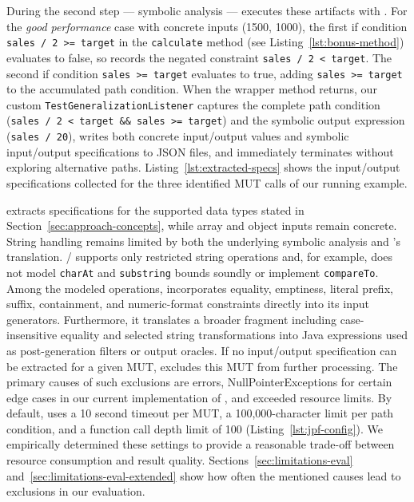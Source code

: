 During the second step --- symbolic analysis --- \ToolTeralizer{} executes these artifacts with \ToolSPF{}.
For the \textit{good performance} case with concrete inputs (1500, 1000),
the first if condition \texttt{sales / 2 >= target}
in the \texttt{calculate} method (see Listing~\ref{lst:bonus-method})
evaluates to false, %
so \ToolSPF{} records the negated constraint \texttt{sales / 2 < target}.
The second if condition \texttt{sales >= target} evaluates to true,
adding \texttt{sales >= target} to the accumulated path condition.
When the wrapper method returns, our custom \texttt{TestGeneralizationListener}
captures the complete path condition
(\texttt{sales / 2 < target \&\& sales >= target}) and the symbolic output expression (\texttt{sales / 20}),
writes both concrete input/output values and symbolic input/output specifications to JSON files,
and immediately terminates \ToolSPF{} without exploring alternative paths.
Listing~\ref{lst:extracted-specs} shows the input/output specifications
collected for the three identified MUT calls of our running example.

\ToolTeralizer{} extracts specifications for the supported data types
stated in Section~\ref{sec:approach-concepts},
while array and object inputs remain concrete.
String handling remains limited by both the underlying symbolic analysis
and \ToolTeralizer{}'s translation.
\ToolSPF{}/\ToolJPF{} supports only restricted string operations and, for example,
does not model \texttt{charAt} and \texttt{substring} bounds soundly or implement
\texttt{compareTo}.
Among the modeled operations, \ToolTeralizer{} incorporates equality, emptiness, literal
prefix, suffix, containment, and numeric-format constraints directly into its input
generators. Furthermore, it translates a broader fragment including case-insensitive
equality and selected string transformations into Java expressions used as
post-generation filters or output oracles.
If no input/output specification can be extracted for a given MUT,
\ToolTeralizer{} excludes this MUT from further processing.
The primary causes of such exclusions are \ToolSPF{} errors,
NullPointerExceptions for certain edge cases
in our current implementation of \ToolTeralizer{},
and exceeded resource limits.
By default, \ToolTeralizer{} uses a 10 second timeout per MUT,
a 100,000-character limit per path condition,
and a function call depth limit of 100 (Listing~\ref{lst:jpf-config}).
We empirically determined these settings to provide
a reasonable trade-off between resource consumption and result quality.
Sections~\ref{sec:limitations-eval} and~\ref{sec:limitations-eval-extended} show
how often the mentioned causes lead to exclusions in our evaluation.
